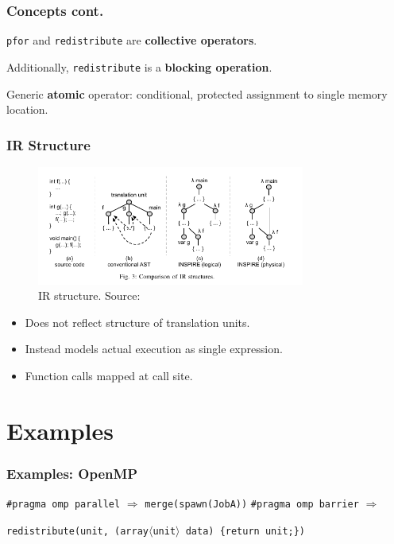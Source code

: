 \documentclass{beamer}
\newcommand\fB[1]{\textcolor{blue!80!black}{\textbf{#1}}}
\begin{document}
\begin{frame}
\frametitle{Concepts cont.}
\texttt{pfor} and \texttt{redistribute} are \fB{collective operators}. 

Additionally, \texttt{redistribute} is a \fB{blocking operation}.
\bigskip

Generic \fB{atomic} operator: conditional, protected assignment to single memory location.
\end{frame}

\begin{frame}
\frametitle{IR Structure}

\begin{figure}
\centering
\includegraphics[width=250pt]{structure}
\caption{IR structure. Source: \cite{JordanPTKF13}}
\end{figure}

\begin{itemize}
\item Does not reflect structure of translation units. 

\item Instead models actual execution as single expression. 

\item Function calls mapped at call site. 
\end{itemize}
\end{frame}

\section{Examples}
\begin{frame}
\frametitle{Examples: OpenMP}

\texttt{\#pragma omp parallel} $\Rightarrow$ \texttt{merge(spawn(JobA))}
\medskip
\newline\pause
\texttt{\#pragma omp barrier} $\Rightarrow$ 


\texttt{redistribute(unit, (array$\langle$unit$\rangle$ data) \{return unit;\})}
\end{frame}
\end{document}
